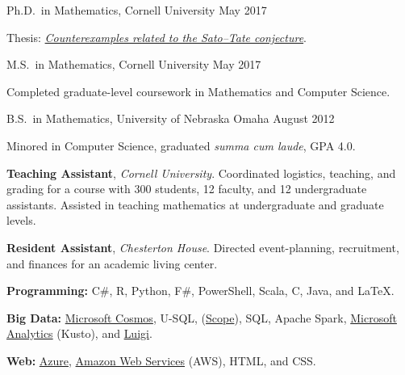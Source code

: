 \documentclass[11pt, letterpaper]{awesome-cv}
\begin{document}

\begin{cventries}

\cventry
	{Ph.D.~in Mathematics, Cornell University}
	{}{}
	{May 2017}
	{
		\begin{cvitems}
			\item{Thesis: \href{http://doi.org/10.7298/X4PN93Q3}{\emph{Counterexamples related to the Sato--Tate conjecture}}.}
		\end{cvitems}
	}
	
\cventry
	{M.S.~in Mathematics, Cornell University}
	{}{}
	{May 2017}
	{
		\begin{cvitems}
			\item{Completed graduate-level coursework in Mathematics and Computer Science.}
		\end{cvitems}
	}
	
\cventry
	{B.S.~in Mathematics, University of Nebraska Omaha}
	{}{}
	{August 2012}
	{
		\begin{cvitems}
			\item{Minored in Computer Science, graduated \emph{summa cum laude}, GPA 4.0.}
		\end{cvitems}
	}
	
\end{cventries}






\begin{cvparagraph}
\textbf{Teaching Assistant}, \emph{Cornell University}. Coordinated logistics, teaching, and grading for a course with 300 students, 12 faculty, and 12 undergraduate assistants.
Assisted in teaching mathematics at undergraduate and graduate levels.

\textbf{Resident Assistant}, \emph{Chesterton House}. Directed event-planning, recruitment, and finances for an academic living center. 
\end{cvparagraph}






\begin{cvparagraph}
\textbf{Programming:} C\#, R, Python, F\#, PowerShell, Scala, C, Java, and \LaTeX.

\textbf{Big Data:}
\href{https://docs.microsoft.com/en-us/azure/cosmos-db/introduction}{Microsoft Cosmos}, 
U-SQL, 
(\href{https://doi.org/10.14778/1454159.1454166}{Scope}),
SQL,
Apache Spark,
\href{https://docs.loganalytics.io/docs/Language-Reference}{Microsoft Analytics} (Kusto),
and 
\href{https://github.com/spotify/luigi}{Luigi}.

\textbf{Web:} 
\href{https://azure.microsoft.com/}{Azure}, 
\href{https://aws.amazon.com/}{Amazon Web Services} (AWS), 
HTML, and CSS.
\end{cvparagraph}
\end{document}
